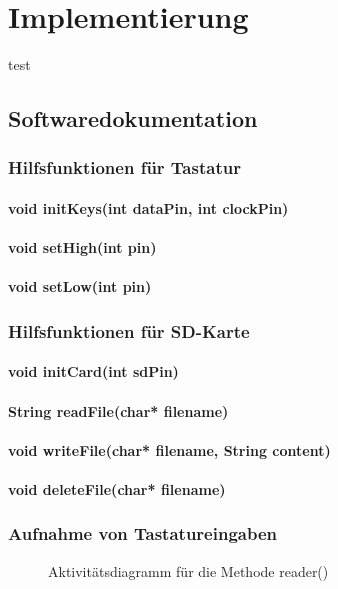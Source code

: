 \chapter{Implementierung}
test



\section{Softwaredokumentation}

\subsection{Hilfsfunktionen für Tastatur}
\subsubsection{void initKeys(int dataPin, int clockPin)}
\subsubsection{void setHigh(int pin)}
\subsubsection{void setLow(int pin)}

\subsection{Hilfsfunktionen für SD-Karte}
\subsubsection{void initCard(int sdPin)}
\subsubsection{String readFile(char* filename)}
\subsubsection{void writeFile(char* filename, String content)}
\subsubsection{void deleteFile(char* filename)}


\subsection{Aufnahme von Tastatureingaben}
\begin{figure}
  \centering
  \caption{Aktivitätsdiagramm für die Methode reader()}
  \label{diagram_reader}
\end{figure}

